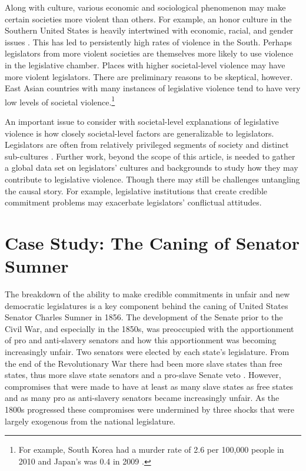 \documentclass[a4paper]{article}\usepackage[]{graphicx}\usepackage[]{color}
\begin{document}
Along with culture, various economic and sociological phenomenon may make certain societies more violent than others. For example, an honor culture in the Southern United States is heavily intertwined with economic, racial, and gender issues \citep[]{nisbett1996culture}. This has led to persistently high rates of violence in the South. Perhaps legislators from more violent societies are themselves more likely to use violence in the legislative chamber. Places with higher societal-level violence may have more violent legislators. There are preliminary reasons to be skeptical, however. East Asian countries with many instances of legislative violence tend to have very low levels of societal violence.\footnote{For example, South Korea had a murder rate of 2.6 per 100,000 people in 2010 and Japan's was 0.4 in 2009 \cite{UNMurder2013}.}

An important issue to consider with societal-level explanations of legislative violence is how closely societal-level factors are generalizable to legislators. Legislators are often from relatively privileged segments of society and distinct sub-cultures \citep[408]{Spary2013}. Further work, beyond the scope of this article, is needed to gather a global data set on legislators' cultures and backgrounds to study how they may contribute to legislative violence. Though there may still be challenges untangling the causal story. For example, legislative institutions that create credible commitment problems may exacerbate legislators' conflictual attitudes.

\section{Case Study: The Caning of Senator Sumner}

The breakdown of the ability to make credible commitments in unfair and new democratic legislatures is a key component behind the caning of United States Senator Charles Sumner in 1856. The development of the Senate prior to the Civil War, and especially in the 1850s, was preoccupied with the apportionment of pro and anti-slavery senators and how this apportionment was becoming increasingly unfair. Two senators were elected by each state's legislature. From the end of the Revolutionary War there had been more slave states than free states, thus more slave state senators and a pro-slave Senate veto \cite[151]{Weingast1998}. However, compromises that were made to have at least as many slave states as free states and as many pro as anti-slavery senators became increasingly unfair. As the 1800s progressed these compromises were undermined by three shocks that were largely exogenous from the national legislature.
\end{document}
